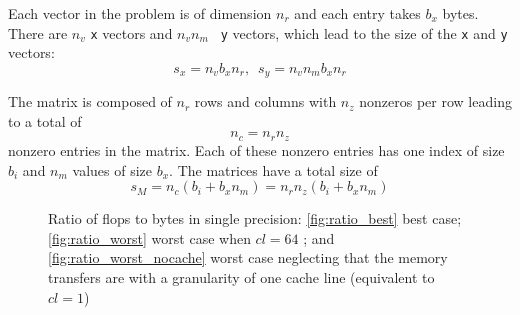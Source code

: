 \documentclass[10pt,conference,compsocconf]{IEEEtran}
\begin{document}
Each vector in the problem is of dimension $n_r$ and each entry
takes $b_x$ bytes. There are $n_v$ {\tt x} vectors and $n_v n_m$ {\tt
  y} vectors, which lead to the size of the {\tt x} and {\tt y} vectors:
$$s_x = n_v b_x n_r\mbox{, ~}s_y = n_v n_m b_x n_r$$

The matrix is composed of $n_r$ rows and columns with $n_z$ nonzeros
per row leading to a total of $$n_c = n_r n_z$$ nonzero entries in
the matrix. Each of these nonzero entries has one index of size $b_i$
and $n_m$ values of size $b_x$. The matrices have a total size
of $$s_M = n_c (b_i + b_x n_m) = n_r n_z (b_i + b_x n_m)$$

\begin{figure}[tbh]
  \centering
  
  \caption{Ratio of flops to bytes in single precision:  
    \ref{fig:ratio_best} best case; \ref{fig:ratio_worst} worst case when $cl=64$ 
    ; and \ref{fig:ratio_worst_nocache} worst case neglecting that the
    memory transfers are with a granularity of one cache line (equivalent to $cl = 1$)}
  \label{fig:ratio_bytes_flops}
\end{figure}
\end{document}
